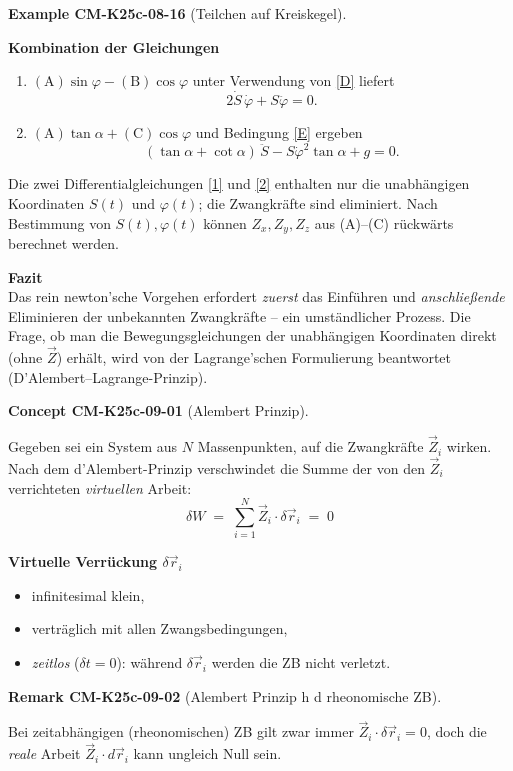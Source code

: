 \documentclass[10pt, letterpaper]{article}
\newcommand{\CustomHeading}[3]{%
  \par\medskip\noindent%
  \textbf{#1 #2} \textnormal{(#3)}.\enskip%
}
\newenvironment{REM}[2]{\CustomHeading{Remark}{#1}{#2}}{}
\newenvironment{EXA}[2]{\CustomHeading{Example}{#1}{#2}}{}
\newenvironment{CONC}[2]{\CustomHeading{Concept}{#1}{#2}}{}
\begin{document}
\begin{EXA}{CM-K25c-08-16}{Teilchen auf Kreiskegel}
\textbf{Kombination der Gleichungen}\\
\begin{enumerate}
  \item[(i)]  $(\text{A})\sin\varphi - (\text{B})\cos\varphi$
              unter Verwendung von \eqref{D} liefert
              \[
                2\dot S\,\dot\varphi + S\ddot\varphi = 0. \tag{1}
              \]
  \item[(ii)] $(\text{A})\tan\alpha + (\text{C})\cos\varphi$
              und Bedingung \eqref{E} ergeben
              \[
                (\tan\alpha + \cot\alpha)\,\ddot S
                - S\dot\varphi^{2}\tan\alpha + g = 0. \tag{2}
              \]
\end{enumerate}
Die zwei Differential­gleichungen \eqref{1} und \eqref{2} enthalten nur
die unabhängigen Koordinaten $S(t)$ und $\varphi(t)$;
die Zwangkräfte sind eliminiert.  
Nach Bestimmung von $S(t),\varphi(t)$ können $Z_x,Z_y,Z_z$ aus
(A)–(C) rückwärts berechnet werden.

\textbf{Fazit}\\
Das rein newton’sche Vorgehen erfordert
\emph{zuerst} das Einführen und
\emph{anschließende} Eliminieren der unbekannten Zwangkräfte – ein
umständlicher Prozess.  
Die Frage, ob man die Bewegungsgleichungen der unabhängigen Koordinaten
direkt (ohne $\vec Z$) erhält, wird von der Lagrange’schen Formulierung
beantwortet (D’Alembert–Lagrange-Prinzip).
\end{EXA}

\begin{CONC}{CM-K25c-09-01}{Alembert Prinzip}
Gegeben sei ein System aus $N$ Massenpunkten, auf die Zwangkräfte 
$\vec Z_i$ wirken.  
Nach dem d’Alembert-Prinzip verschwindet die Summe der von den 
$\vec Z_i$ verrichteten \emph{virtuellen} Arbeit:
\[
  \boxed{\;
    \delta W \;=\;\sum_{i=1}^{N}\vec Z_i\!\cdot\!\delta\vec r_i \;=\;0
  \;}
\]

\textbf{Virtuelle Verrückung $\delta\vec r_i$}
\begin{itemize}
  \item infinitesimal klein,
  \item verträglich mit allen Zwangsbedingungen,
  \item \emph{zeitlos} ($\delta t=0$): während $\delta\vec r_i$ werden 
        die ZB nicht verletzt.
\end{itemize}
\end{CONC}

\begin{REM}{CM-K25c-09-02}{Alembert Prinzip h d rheonomische ZB}
Bei zeitabhängigen (rheonomischen) ZB gilt zwar immer 
$\vec Z_i\!\cdot\!\delta\vec r_i=0$,  
doch die \emph{reale} Arbeit $\vec Z_i\!\cdot\!d\vec r_i$ kann ungleich 
Null sein.
\end{REM}
\end{document}
